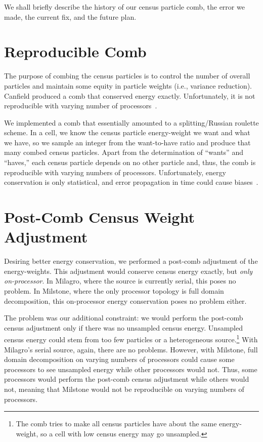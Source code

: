 \documentclass[10pt]{nmemo}
\begin{document}
We shall briefly describe the history of our census particle comb, the 
error we made, the current fix, and the future plan.

\section{Reproducible Comb}

The purpose of combing the census particles is to control the number
of overall particles and maintain some equity in particle weights
(i.e., variance reduction).  Canfield produced a comb that conserved
energy exactly.  Unfortunately, it is not reproducible with varying
number of processors~\cite{ev98}.

We implemented a comb that essentially amounted to a splitting/Russian
roulette scheme.  In a cell, we know the census particle energy-weight
we want and what we have, so we sample an integer from the
want-to-have ratio and produce that many combed census particles.
Apart from the determination of ``wants'' and ``haves,'' each census
particle depends on no other particle and, thus, the comb is
reproducible with varying numbers of processors.  Unfortunately,
energy conservation is only statistical, and error propagation in time
could cause biases~\cite{ev98}.

\section{Post-Comb Census Weight Adjustment}

Desiring better energy conservation, we performed a post-comb
adjustment of the energy-weights.  This adjustment would conserve
census energy exactly, but {\em only on-processor}.  In Milagro, where 
the source is currently serial, this poses no problem.  In Milstone,
where the only processor topology is full domain decomposition, this
on-processor energy conservation poses no problem either.  

The problem was our additional constraint: we would perform the
post-comb census adjustment only if there was no unsampled census
energy.  Unsampled census energy could stem from too few particles or
a heterogeneous source.\footnote{The comb tries to make all census
  particles have about the same energy-weight, so a cell with low
  census energy may go unsampled.}  With Milagro's serial source,
again, there are no problems.  However, with Milstone, full domain
decomposition on varying numbers of processors could cause some
processors to see unsampled energy while other processors would not.
Thus, some processors would perform the post-comb census adjustment
while others would not, meaning that Milstone would not be
reproducible on varying numbers of processors.
\end{document}
